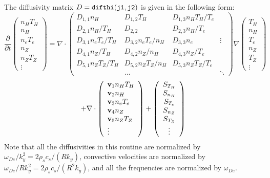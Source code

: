 The diffusivity matrix $ D = {\tt difthi(j1,j2)}$
is given in the following form:
$$ \frac{\partial}{\partial t}
 \left( \begin{array}{c} n_H T_H  \\ n_H \\ n_e T_e \\ 
    n_Z \\ n_Z T_Z \\ \vdots
    \end{array} \right)
 = \nabla \cdot
\left( \begin{array}{llll} 
D_{1,1} n_H & D_{1,2} T_H & D_{1,3} n_H T_H / T_e \\
D_{2,1} n_H / T_H & D_{2,2} & D_{2,3} n_H / T_e \\
D_{3,1} n_e T_e / T_H & D_{3,2} n_e T_e / n_H & D_{3,3} n_e & \vdots \\
D_{4,1} n_Z / T_H & D_{4,2} n_Z / n_H & D_{4,3} n_Z / T_e \\
D_{5,1} n_Z T_Z / T_H & D_{5,2} n_Z T_Z / n_H & 
        D_{5,3} n_Z T_Z / T_e \\
 & \ldots & & \ddots
\end{array} \right)
 \nabla
 \left( \begin{array}{c}  T_H \\ n_H \\  T_e \\ 
   n_Z \\  T_Z \\ \vdots
    \end{array} \right)
$$
$$
 + \nabla \cdot
\left( \begin{array}{l} {\bf v}_1 n_H T_H \\ {\bf v}_2 n_H \\
   {\bf v}_3 n_e T_e \\
   {\bf v}_4 n_Z \\ {\bf v}_5 n_Z T_Z \\ \vdots \end{array} \right) +
 \left( \begin{array}{c} S_{T_H} \\ S_{n_H} \\ S_{T_e} \\
    S_{n_Z} \\ S_{T_Z} \\ \vdots
    \end{array} \right) $$
Note that all the diffusivities in this routine are normalized by
$ \omega_{De} / k_y^2 = 2 \rho_s c_s / ( R k_y ) $, 
convective velocities are normalized by 
$ \omega_{De} / R k_y^2 = 2 \rho_s c_s / ( R^2 k_y ) $,
and all the frequencies are normalized by $ \omega_{De} $.

